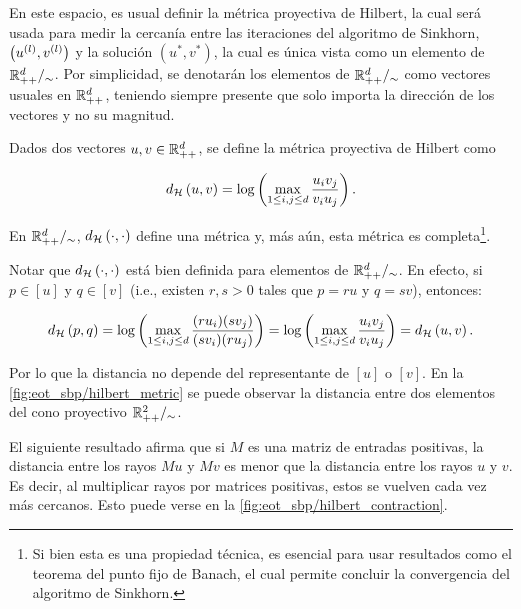 En este espacio, es usual definir la métrica proyectiva de Hilbert, la cual será usada para medir la cercanía entre las iteraciones del algoritmo de Sinkhorn, $\left(u^{(l)}, v^{(l)}\right)$ y la solución $(u^*,v^*)$, la cual es única vista como un elemento de $\mathbb{R}^{d}_{++}/_\sim$. Por simplicidad, se denotarán los elementos de $\mathbb{R}^{d}_{++}/_\sim$ como vectores usuales en $\mathbb{R}_{++}^d$, teniendo siempre presente que solo importa la dirección de los vectores y no su magnitud.

\begin{prop}
	Dados dos vectores $u,v\in\mathbb{R}^d_{++}$, se define la métrica proyectiva de Hilbert como

	\begin{equation}
		\label{eq:hilbert_metric}
		d_{\mathcal{H}}\left(u,v\right) = \log\left(\max_{1\leq i,j\leq d} \frac{u_i v_j}{v_i u_j}\right).
	\end{equation}

	En $\mathbb{R}^{d}_{++}/_\sim$, $d_{\mathcal{H}}\left(\cdot,\cdot\right)$ define una métrica y, más aún, esta métrica es completa\footnote{Si bien esta es una propiedad técnica, es esencial para usar resultados como el teorema del punto fijo de Banach, el cual permite concluir la convergencia del algoritmo de Sinkhorn.}.

\end{prop}

Notar que $d_{\mathcal{H}}\left(\cdot,\cdot\right)$ está bien definida para elementos de $\mathbb{R}^{d}_{++}/_\sim$. En efecto, si $p\in[u]$ y $q\in[v]$ (i.e., existen $r,s>0$ tales que $p=ru$ y $q=sv$), entonces:

\begin{equation*}
	d_{\mathcal{H}}\left(p,q\right)
	= \log\left(\max_{1\leq i,j\leq d} \frac{(ru_i)(sv_j)}{(sv_i)(ru_j)}\right)
	= \log\left(\max_{1\leq i,j\leq d} \frac{u_i v_j}{v_i u_j}\right)
	= d_{\mathcal{H}}\left(u,v\right).
\end{equation*}

Por lo que la distancia no depende del representante de $[u]$ o $[v]$. En la \autoref{fig:eot_sbp/hilbert_metric} se puede observar la distancia entre dos elementos del cono proyectivo $\mathbb{R}^{2}_{++}/_\sim$.


El siguiente resultado afirma que si $M$ es una matriz de entradas positivas, la distancia entre los rayos $Mu$ y $Mv$ es menor que la distancia entre los rayos $u$ y $v$. Es decir, al multiplicar rayos por matrices positivas, estos se vuelven cada vez más cercanos. Esto puede verse en la \autoref{fig:eot_sbp/hilbert_contraction}.

